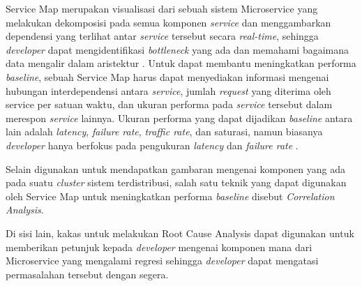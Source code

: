 Service Map merupakan visualisasi dari sebuah sistem Microservice yang melakukan dekomposisi pada semua komponen \textit{service} dan menggambarkan dependensi yang terlihat antar \textit{service} tersebut secara \textit{real-time}, sehingga \textit{developer} dapat mengidentifikasi \textit{bottleneck} yang ada dan memahami bagaimana data mengalir dalam aristektur \citep{datadog-svcmap}. Untuk dapat membantu meningkatkan performa \textit{baseline}, sebuah Service Map harus dapat menyediakan informasi mengenai hubungan interdependensi antara \textit{service}, jumlah \textit{request} yang diterima oleh service per satuan waktu, dan ukuran performa pada \textit{service} tersebut dalam merespon \textit{service} lainnya. Ukuran performa yang dapat dijadikan \textit{baseline} antara lain adalah \textit{latency}, \textit{failure rate}, \textit{traffic rate}, dan saturasi, namun biasanya \textit{developer} hanya berfokus pada pengukuran \textit{latency} dan \textit{failure rate} \citep{parker2020distributed}.

Selain digunakan untuk mendapatkan gambaran mengenai komponen yang ada pada suatu \textit{cluster} sistem terdistribusi, salah satu teknik yang dapat digunakan oleh Service Map untuk meningkatkan performa \textit{baseline}  disebut \textit{Correlation Analysis}.

Di sisi lain, kakas untuk melakukan Root Cause Analysis dapat digunakan untuk memberikan petunjuk kepada \textit{developer} mengenai komponen mana dari Microservice yang mengalami regresi sehingga \textit{developer} dapat mengatasi permasalahan tersebut dengan segera. 









%



%
%
%


